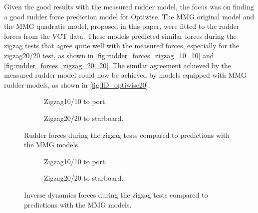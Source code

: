 Given the good results with the measured rudder model, the focus was on finding a good rudder force prediction model for Optiwise. The MMG original model and the MMG quadratic model, proposed in this paper, were fitted to the rudder forces from the VCT data. These models predicted similar forces during the zigzag tests that agree quite well with the measured forces, especially for the zigzag20/20 test, as shown in \autoref{fig:rudder_forces_zigzag_10_10} and \autoref{fig:rudder_forces_zigzag_20_20}.
The similar agreement achieved by the measured rudder model could now be achieved by models equipped with MMG rudder models, as shown in \autoref{fig:ID_optiwise20}.


\begin{figure}[h]
    \centering
    \begin{subfigure}[b]{\textwidth}
        \centering
        
        \caption{Zigzag10/10 to port.}
        \label{fig:rudder_forces_zigzag_10_10}
    \end{subfigure}
     \vfill
    \begin{subfigure}[b]{\textwidth}
        \centering
        
        \caption{Zigzag20/20 to starboard.}
        \label{fig:rudder_forces_zigzag_20_20}
    \end{subfigure}
    \caption{Rudder forces during the zigzag tests compared to predictions with the MMG models.}
    \label{fig:rudder_forces_zigzag}
\end{figure}


\begin{figure}[h]
    \centering
    \begin{subfigure}[b]{\textwidth}
        \centering
        
        \caption{Zigzag10/10 to port.}
        \label{fig:ID_MMG_zigzag_10_10}
    \end{subfigure}
     \vfill
    \begin{subfigure}[b]{\textwidth}
        \centering
        
        \caption{Zigzag20/20 to starboard.}
        \label{fig:ID_MMG_zigzag_20_20}
    \end{subfigure}
    \caption{Inverse dynamics forces during the zigzag tests compared to predictions with the MMG models.}
    \label{fig:ID_optiwise20}
\end{figure}



